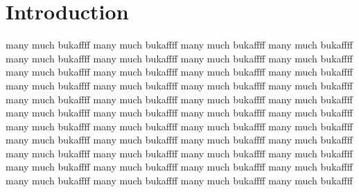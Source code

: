 \documentclass[runningheads]{llncs}
\begin{document}
\section{Introduction}
many much bukaffff 
many much bukaffff
many much bukaffff
many much bukaffff
many much bukaffff
many much bukaffff
many much bukaffff
many much bukaffff
many much bukaffff
many much bukaffff
many much bukaffff
many much bukaffff
many much bukaffff
many much bukaffff
many much bukaffff
many much bukaffff
many much bukaffff
many much bukaffff
many much bukaffff
many much bukaffff
many much bukaffff
many much bukaffff
many much bukaffff
many much bukaffff
many much bukaffff
many much bukaffff
many much bukaffff
many much bukaffff
many much bukaffff
many much bukaffff
many much bukaffff
many much bukaffff
many much bukaffff
many much bukaffff
many much bukaffff
many much bukaffff
many much bukaffff
many much bukaffff
many much bukaffff
many much bukaffff
many much bukaffff
many much bukaffff
many much bukaffff
many much bukaffff
\end{document}
